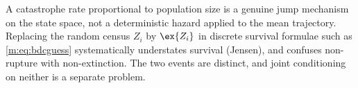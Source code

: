 \begin{remark}
\label{m:rem:catastrophe-not-meanfield}
A catastrophe rate proportional to population size is a genuine jump mechanism on
the state space, not a deterministic hazard applied to the mean trajectory. Replacing
the random census $Z_i$ by $\ex{Z_i}$ in discrete survival formulae such as
\cref{m:eq:bdcguess} systematically understates survival (Jensen), and confuses
non-rupture with non-extinction. The two events are distinct, and joint
conditioning on neither is a separate problem.
\end{remark}

\FloatBarrier
